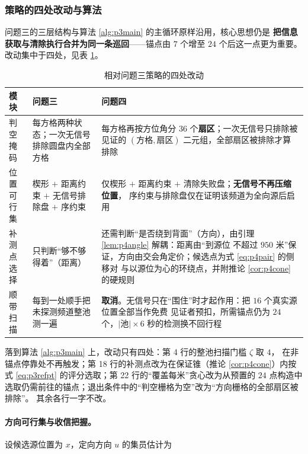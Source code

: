\documentclass[withoutpreface, bwprint]{cumcmthesis}
\begin{document}
\subsubsection{策略的四处改动与算法}

问题三的三层结构与算法 \ref{alg:p3main} 的主循环原样沿用，核心思想仍是
\textbf{把信息获取与清除执行合并为同一条巡回}——锚点由 $7$ 个增至 $24$ 个后这一点更为重要。
改动集中于四处，见表 \ref{tab:p4change}。

\begin{table}[H]
  \centering
  \caption{相对问题三策略的四处改动}
  \label{tab:p4change}
  \footnotesize
  \begin{tabularx}{\textwidth}{lXX}
    \toprule
    模块 & 问题三 & 问题四 \\
    \midrule
    判空掩码 & 每方格两种状态；一次无信号排除圆盘内全部方格
      & 每方格再按方位角分 $36$ 个\textbf{扇区}；一次无信号只排除被见证的
        $(\text{方格},\text{扇区})$ 二元组，全部扇区被排除才算排除 \\
    位置可行集 & 楔形 $+$ 距离约束 $+$ 无信号排除盘 $+$ 序约束
      & 仅楔形 $+$ 距离约束 $+$ 清除失败盘；\textbf{无信号不再压缩位置}，
        序约束与排除盘仅在证明该频道为全向源后启用 \\
    补测点选择 & 只判断“够不够得着”（距离）
      & 还需判断“是否绕到背面”（方向），由引理 \ref{lem:p4angle} 解耦：距离由“到源位
        不超过 $950$ 米”保证，方向由交会角定价；候选点为式 \eqref{eq:p4pair} 的侧移对
        与以源位为心的环绕点，并附推论 \ref{cor:p4cone} 的硬规则 \\
    顺带扫描 & 每到一处顺手把未探测频道整池测一遍
      & \textbf{取消}。无信号只在“围住”时才起作用：把 $16$ 个真实源位置全部当作免费
        见证者预扣，所需锚点仍为 $24$ 个，$\lvert\text{池}\rvert\times 6$ 秒的检测换不回行程 \\
    \bottomrule
  \end{tabularx}
\end{table}

落到算法 \ref{alg:p3main} 上，改动只有四处：第 4 行的整池扫描门槛 $\zeta$ 取 $4$，
在非锚点停靠处不再触发；第 18 行的补测点改为在保证锥（推论 \ref{cor:p4cone}）内按
式 \eqref{eq:p3refpt} 的评分选取；第 22 行的“覆盖每米”贪心改为从预置的 $24$ 点构造中
选取仍需前往的锚点；退出条件中的“判空栅格为空”改为“方向栅格的全部扇区被排除”。
其余各行一字不改。

\paragraph{方向可行集与收信把握。}
设候选源位置为 $x$，定向方向 $u$ 的集员估计为
\end{document}
